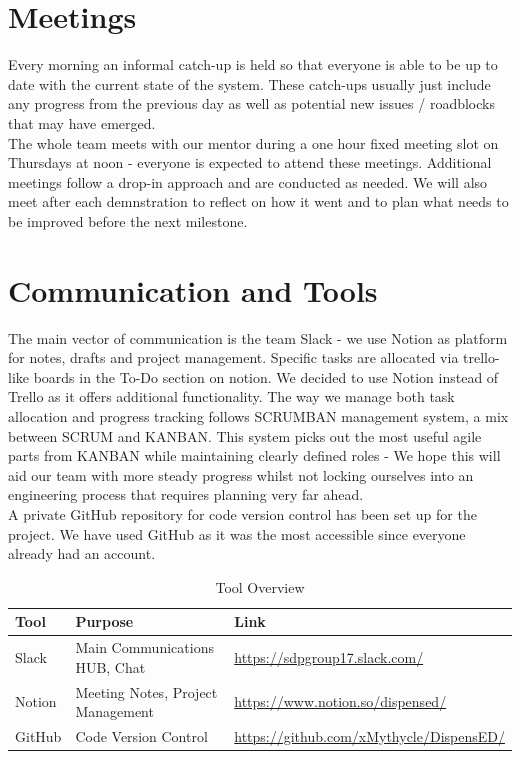 \documentclass[a4paper,10pt,DIV10,openright,openbib]{scrreprt}
\let\oldbibliography%
\renewcommand{}[1]{{%
  \let\chapter\section%
  \oldbibliography{#1}}}%
\begin{document}
\section{Meetings}
Every morning an informal catch-up is held so that everyone is able to be up to
date with the current state of the system. These catch-ups usually just include
any progress from the previous day as well as potential new issues / roadblocks
that may have emerged.\\
The whole team meets with our mentor during a one hour fixed meeting slot on
Thursdays at noon - everyone is expected to attend these meetings.
Additional meetings follow a drop-in approach and are conducted as needed.
We will also meet after each demnstration to reflect on how it went and to plan
what needs to be improved before the next milestone.


\section{Communication and Tools}
The main vector of communication is the team Slack - we use Notion as platform for notes,
drafts and project management. Specific tasks are allocated via trello-like boards in
the To-Do section on notion. We decided to use Notion instead of Trello as it
offers additional functionality. The way we manage both task allocation and
progress tracking follows SCRUMBAN management system, a mix between SCRUM
and KANBAN. This system picks out the most useful agile parts from KANBAN while
maintaining clearly defined roles - We hope this will aid our team with more
steady progress whilst not locking ourselves into an engineering process that
requires planning very far ahead. \\
A private GitHub repository for code version control has been set
up for the project. We have used GitHub as it was the most accessible since
everyone already had an account.\\
\begin{table}[h]
\centering
\caption{Tool Overview}
\begin{tabular}{@{}lll@{}}
\toprule
Tool   & Purpose                                   & Link     \\ \midrule
Slack  & Main Communications HUB, Chat             & \url{https://sdpgroup17.slack.com/} \\
Notion & Meeting Notes, Project Management & \url{https://www.notion.so/dispensed/} \\
GitHub & Code Version Control                      & \url{https://github.com/xMythycle/DispensED/} \\ \bottomrule
\end{tabular}
\end{table}




%


\end{document}
